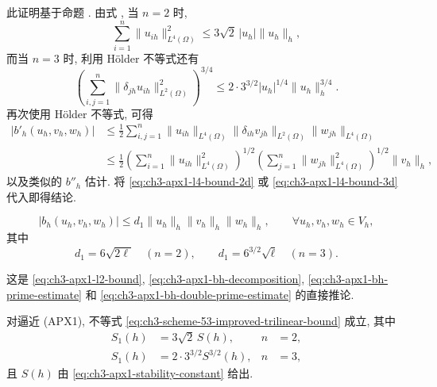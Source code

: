 \hypertarget{chapter-03-page-263}{}
\begin{Proof}
此证明基于命题 . 由式 , 当 $n=2$ 时,
\begin{equation}
\sum_{i=1}^n\lVert u_{ih}\rVert_{L^4(\Omega)}^2
\leq3\sqrt2\,|u_h|\lVert u_h\rVert_h,
\label{eq:ch3-apx1-l4-bound-2d}
\end{equation}
而当 $n=3$ 时, 利用 H\"older 不等式还有
\begin{equation}
\left(\sum_{i,j=1}^n\lVert\delta_{jh}u_{ih}\rVert_{L^2(\Omega)}^2\right)^{3/4}
\leq2\cdot3^{3/2}|u_h|^{1/4}\lVert u_h\rVert_h^{3/4}.
\label{eq:ch3-apx1-l4-bound-3d}
\end{equation}
再次使用 H\"older 不等式, 可得
\begin{align*}
|b'_h(u_h,v_h,w_h)|
&\leq\frac12\sum_{i,j=1}^n\lVert u_{ih}\rVert_{L^4(\Omega)}
\lVert\delta_{ih}v_{jh}\rVert_{L^2(\Omega)}\lVert w_{jh}\rVert_{L^4(\Omega)}\\
&\leq\frac12\left(\sum_{i=1}^n\lVert u_{ih}\rVert_{L^4(\Omega)}^2\right)^{1/2}
\left(\sum_{j=1}^n\lVert w_{jh}\rVert_{L^4(\Omega)}^2\right)^{1/2}\lVert v_h\rVert_h,
\end{align*}
以及类似的 $b''_h$ 估计. 将 \eqref{eq:ch3-apx1-l4-bound-2d} 或 \eqref{eq:ch3-apx1-l4-bound-3d} 代入即得结论.
\end{Proof}

\begin{Lemma}
\label{lem:ch3-apx1-trilinear-continuity}
\begin{equation}
|b_h(u_h,v_h,w_h)|\leq d_1\lVert u_h\rVert_h\lVert v_h\rVert_h\lVert w_h\rVert_h,
\qquad\forall u_h,v_h,w_h\in V_h,
\label{eq:ch3-apx1-bh-continuity}
\end{equation}
其中
\begin{equation}
d_1=6\sqrt{2\ell}\quad(n=2),
\qquad d_1=6^{3/2}\sqrt\ell\quad(n=3).
\label{eq:ch3-apx1-bh-continuity-constant}
\end{equation}
\end{Lemma}

\begin{Proof}
这是 \eqref{eq:ch3-apx1-l2-bound}, \eqref{eq:ch3-apx1-bh-decomposition}, \eqref{eq:ch3-apx1-bh-prime-estimate} 和 \eqref{eq:ch3-apx1-bh-double-prime-estimate} 的直接推论.
\end{Proof}

\hypertarget{chapter-03-page-264}{}
\begin{Proposition}
\label{prop:ch3-apx1-s1-bound}
对逼近 (APX1), 不等式 \eqref{eq:ch3-scheme-53-improved-trilinear-bound} 成立, 其中
\begin{equation}
\begin{aligned}
S_1(h)&=3\sqrt2\,S(h), & n&=2,\\
S_1(h)&=2\cdot3^{3/2}S^{3/2}(h), & n&=3,
\end{aligned}
\label{eq:ch3-apx1-s1}
\end{equation}
且 $S(h)$ 由 \eqref{eq:ch3-apx1-stability-constant} 给出.
\end{Proposition}

